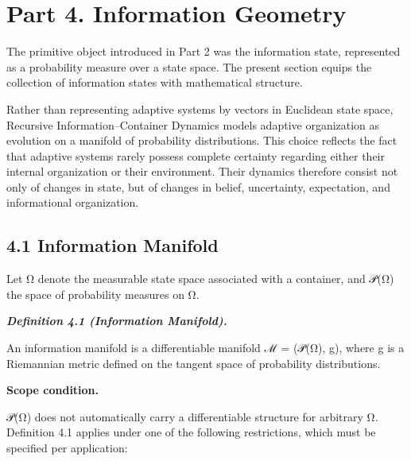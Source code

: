 \documentclass[
]{article}
\begin{document}
\hypertarget{part-4.-information-geometry}{%
\section{Part 4. Information
Geometry}\label{part-4.-information-geometry}}

The primitive object introduced in Part 2 was the information state,
represented as a probability measure over a state space. The present
section equips the collection of information states with mathematical
structure.

Rather than representing adaptive systems by vectors in Euclidean state
space, Recursive Information--Container Dynamics models adaptive
organization as evolution on a manifold of probability distributions.
This choice reflects the fact that adaptive systems rarely possess
complete certainty regarding either their internal organization or their
environment. Their dynamics therefore consist not only of changes in
state, but of changes in belief, uncertainty, expectation, and
informational organization.

\hypertarget{information-manifold}{%
\subsection{4.1 Information Manifold}\label{information-manifold}}

Let Ω denote the measurable state space associated with a container, and
𝒫(Ω) the space of probability measures on Ω.

\emph{\textbf{Definition 4.1 (Information Manifold).}}

An information manifold is a differentiable manifold ℳ = (𝒫(Ω), g),
where g is a Riemannian metric defined on the tangent space of
probability distributions.

\textbf{Scope condition.}

𝒫(Ω) does not automatically carry a differentiable structure for
arbitrary Ω. Definition 4.1 applies under one of the following
restrictions, which must be specified per application:
\end{document}
